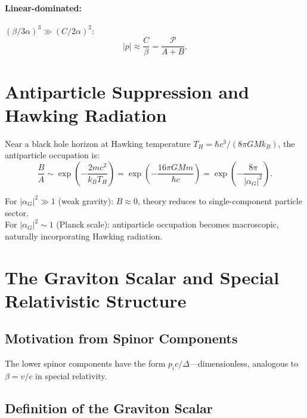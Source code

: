 \documentclass[11pt,a4paper]{article}
\theoremstyle{definition}
\theoremstyle{remark}
\begin{document}
	\paragraph{Linear-dominated:} $(\beta/3\alpha)^3\gg(C/2\alpha)^2$:
	\begin{equation}
		|p| \approx \frac{C}{\beta} = \frac{\mathcal{P}}{A+B}.
	\end{equation}
	
	\section{Antiparticle Suppression and Hawking Radiation}
	
	Near a black hole horizon at Hawking temperature $T_H=\hbar c^3/(8\pi GMk_B)$, the antiparticle occupation is:
	\begin{equation}
		\frac{B}{A} \sim \exp\!\left(-\frac{2mc^2}{k_BT_H}\right) = \exp\!\left(-\frac{16\pi GMm}{\hbar c}\right) = \exp\!\left(-\frac{8\pi}{|\alpha_G|^2}\right).
	\end{equation}
	
	For $|\alpha_G|^2\gg1$ (weak gravity): $B\approx0$, theory reduces to single-component particle sector.\\
	For $|\alpha_G|^2\sim1$ (Planck scale): antiparticle occupation becomes macroscopic, naturally incorporating Hawking radiation.
	
	\section{The Graviton Scalar and Special Relativistic Structure}
	\label{sec:graviton_scalar}
	
	\subsection{Motivation from Spinor Components}
	
	The lower spinor components have the form $p_ic/\Delta$---dimensionless, analogous to $\beta=v/c$ in special relativity.
	
	\subsection{Definition of the Graviton Scalar}
	
\end{document}
